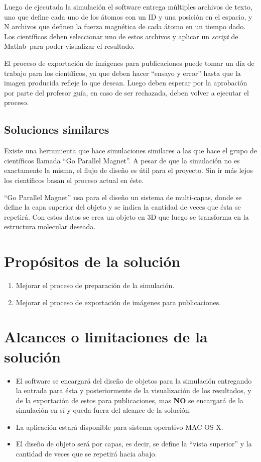 Luego de ejecutada la simulación el software entrega múltiples archivos de texto, uno que define cada uno de los átomos con un ID y una posición en el espacio, y N archivos que definen la fuerza magnética de cada átomo en un tiempo dado. Los científicos deben seleccionar uno de estos archivos y aplicar un \emph{script} de Matlab\textregistered\ para poder visualizar el resultado.

El proceso de exportación de imágenes para publicaciones puede tomar un día de trabajo para los científicos, ya que deben hacer ``ensayo y error'' hasta que la imagen producida refleje lo que desean. Luego deben esperar por la aprobación por parte del profesor guía, en caso de ser rechazada, deben volver a ejecutar el proceso.

\subsection{Soluciones similares}
Existe una herramienta que hace simulaciones similares a las que hace el grupo de científicos llamada ``Go Parallel Magnet\textregistered''. A pesar de que la simulación no es exactamente la misma, el flujo de diseño es útil para el proyecto. Sin ir más lejos los científicos basan el proceso actual en éste.

``Go Parallel Magnet\textregistered'' usa para el diseño un sistema de multi-capas, donde se define la capa superior del objeto y se indica la cantidad de veces que ésta se repetirá. Con estos datos se crea un objeto en 3D que luego se transforma en la estructura molecular deseada.

\section{Propósitos de la solución}
\begin{enumerate}
  \item Mejorar el proceso de preparación de la simulación.
  \item Mejorar el proceso de exportación de imágenes para publicaciones.
\end{enumerate}


\section{Alcances o limitaciones de la solución}
\begin{itemize}
	\item El software se encargará del diseño de objetos para la simulación entregando la entrada para ésta y posteriormente de la visualización de los resultados, y de la exportación de estos para publicaciones, mas \textbf{NO} se encargará de la simulación en sí y queda fuera del alcance de la solución.
	\item La aplicación estará disponible para sistema operativo MAC OS X.
	\item El diseño de objeto será por capas, es decir, se define la ``vista superior'' y la cantidad de veces que se repetirá hacia abajo.
\end{itemize}

